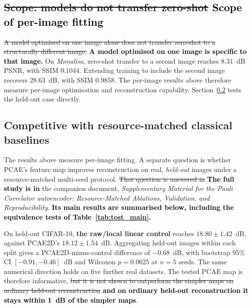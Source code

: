 \documentclass[pdflatex,sn-basic]{sn-jnl}
\newcommand{\snew}[1]{\textbf{\textcolor{studentgreen}{#1}}}
\newcommand{\del}[1]{\sout{#1}}
\newcommand{\add}[1]{\textbf{\textcolor{black}{#1}}}
\begin{document}
\subsection[Scope of per-image fitting]{\del{Scope: models do not transfer zero-shot} \add{Scope of per-image fitting}}
\label{sec:no_generalization}

\del{A model optimised on one image alone does not transfer zero-shot to a
structurally different image.} \add{A model optimised on one image is specific
to that image.} On \textit{Monalisa}, zero-shot transfer to a
second image reaches $8.31$~dB PSNR, with SSIM $0.1044$. Extending training to
include the second image recovers $28.63$~dB, with SSIM $0.9858$. The per-image
results above therefore measure per-image optimisation and reconstruction
capability. Section~\ref{sec:ablation_relationship} tests the held-out case
directly.

\color{black}

\subsection{Competitive with resource-matched classical baselines}
\label{sec:ablation_relationship}
\color{green}
The results above measure per-image fitting. A separate question is whether
PCAE's feature map improves reconstruction on real, \emph{held-out} images under
a resource-matched multi-seed protocol. \del{That question is answered in} \add{The full study is in} the
companion document, \textit{Supplementary Material for the Pauli Correlator autoencoder: Resource-Matched Ablations, Validation, and Reproducibility}. \add{Its
main results are summarised below, including the equivalence tests of
Table~\ref{tab:tost_main}.}

On held-out CIFAR-10, \snew{the raw/local linear control} reaches
$18.80\pm1.42$~dB, against PCAE2D's $18.12\pm1.54$~dB. Aggregating held-out
images within each split gives a PCAE2D-minus-control difference of $-0.68$~dB,
with bootstrap 95\% CI $[-0.91,-0.46]$~dB and Wilcoxon $p=0.0625$ at $n=5$
seeds. The same numerical direction holds on five further real datasets. The
tested PCAE map is therefore informative, \del{but it is not shown to outperform the
simpler maps on ordinary held-out reconstruction} \add{and on ordinary held-out
reconstruction it stays within 1~dB of the simpler maps}.
\end{document}
